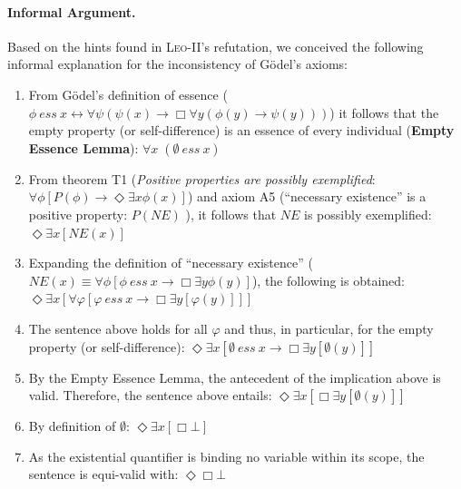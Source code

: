 \documentclass{llncs}
\newcommand{\imp}{{\rightarrow}}
\newcommand{\biimp}{\leftrightarrow}
\newcommand{\allq}{\forall}
\newcommand{\exq}{\exists}
\newcommand{\Dia}{\Diamond} %
\newcommand{\NE}{\mathit{NE}}
\newcommand{\ess}[2]{#1\ \mathit{ess}\ #2}
\newcommand{\nec}{\Box}
\newcommand{\pos}{\Dia}
\begin{document}

\paragraph{Informal Argument.} \label{sec:arg1}
Based on the hints found in \textsc{Leo-II}'s refutation, we conceived the following informal explanation for the inconsistency of G\"odel's axioms:

\begin{enumerate}
\item From G\"odel's definition of essence 
(${\ess{\phi}{x} \biimp {\allq \psi} (\psi(x)
\imp {\nec} \allq y (\phi(y) \imp \psi(y)))}$) it follows that the
empty property (or self-difference) is an essence of every individual
(\textbf{Empty Essence Lemma}): \hfill $\allq x\; (\ess{\emptyset}{x})$

\item From theorem T1 (\textit{Positive properties are possibly
  exemplified}: ${\allq \phi} [P(\phi) \imp {\pos}  \exq x
  \phi(x)]$) and axiom A5 (``necessary existence'' is a positive
  property: $P(\NE)$ ), it follows that $\NE$ is possibly exemplified:
  \hfill $  \pos \exq x [\NE(x)] $
 
\item Expanding the definition of ``necessary existence''
  (${\NE(x) \equiv \allq \phi [\ess{\phi}{x} \imp \nec \exq y
    \phi(y)]}$), the following is obtained: \hfill $  \pos \exq x
  [\allq \varphi [ \ess{\varphi}{x} \imp \nec \exq y [\varphi(y)] ] ] $

\item The sentence above holds for all $\varphi$ and thus, in
  particular, for the empty property (or self-difference): \hfill $\pos \exq x [ \ess{\emptyset}{x} \imp \nec \exq y [\emptyset(y)] ]$

\item By the Empty Essence Lemma, the antecedent of the implication
  above is valid. Therefore, the sentence above entails: \hfill $\pos \exq x [ \nec \exq y [\emptyset(y)] ]$ 

\item By definition of $\emptyset$: \hfill $\pos \exq x [ \nec \bot ]$

\item As the existential quantifier is binding no variable within its
  scope, the sentence is equi-valid with: \hfill $\pos \nec \bot $


\end{enumerate}
\end{document}
